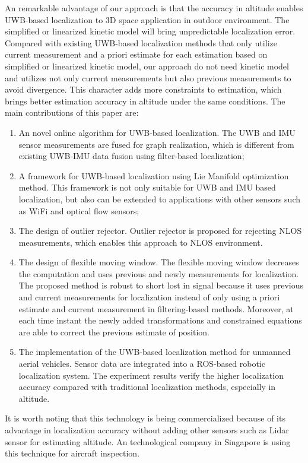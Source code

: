 \documentclass[journal]{IEEEtran}
\begin{document}
An remarkable advantage of our approach is that the accuracy in altitude enables UWB-based localization to 3D space application in outdoor environment. The simplified or linearized kinetic model will bring unpredictable localization error. Compared with existing UWB-based localization methods that only utilize current measurement and a priori estimate for each estimation based on simplified or linearized kinetic model, our approach do not need kinetic model and utilizes not only current measurements but also previous measurements to avoid divergence. This character adds more constraints to estimation, which brings better estimation accuracy in altitude under the same conditions.
The main contributions of this paper are: 
\begin{enumerate}
\item An novel online algorithm for UWB-based localization. The UWB and IMU sensor measurements are fused for graph realization, which is different from existing UWB-IMU data fusion using filter-based localization;
\item A framework for UWB-based localization using Lie Manifold optimization method. This framework is not only suitable for UWB and IMU based localization, but also can be extended to applications with other sensors such as WiFi and optical flow sensors;
\item The design of outlier rejector.  Outlier rejector is proposed for rejecting NLOS measurements, which enables this approach to NLOS environment.
\item The design of flexible moving window. The flexible moving window decreases the computation and uses previous and newly measurements for localization. The proposed method is robust to short lost in signal because it uses previous and current measurements for localization instead of only using a priori estimate and current measurement in filtering-based methods. Moreover, at each time instant the newly added transformations and constrained equations are able to correct the previous estimate of position.
\item The implementation of the UWB-based localization method for unmanned aerial vehicles. Sensor data are integrated into a ROS-based robotic localization system. The experiment results verify the higher localization accuracy compared with traditional localization methods, especially in altitude. 
\end{enumerate}

It is worth noting that this technology is being commercialized because of its advantage in  localization accuracy without adding other sensors such as Lidar sensor for estimating altitude. An technological company in Singapore is using this technique for aircraft inspection.
\end{document}
